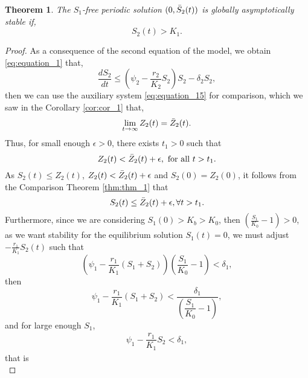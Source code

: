 \documentclass[10pt,letterpaper]{article}
\newtheorem{theorem}{Theorem}
\begin{document}
\begin{theorem}\label{thm:thm_6}
The $S_1$-free periodic solution $(0,\Bar{S}_2(t))$ is globally asymptotically stable if,
\begin{equation}\label{eq:equation_24}
    S_2(t)>K_1.
\end{equation}
\end{theorem}
\begin{proof}
As a consequence of the second equation of the model, we obtain \eqref{eq:equation_1} that,
\begin{equation}\label{eq:equation_25}
 \dfrac{dS_2}{dt}\leq\left(\psi_2-\dfrac{r_2}{K_2}S_2\right)S_2- \delta_2 S_2,   
\end{equation}
then we can use the auxiliary system \eqref{eq:equation_15} for comparison, which we saw in the Corollary \eqref{cor:cor_1} that,
\begin{equation}\label{eq:equation_26}
    \lim_{t \to \infty} Z_2(t) = \Bar{Z}_2(t).
\end{equation}
Thus, for small enough $\epsilon>0$, there exists $t_1>0$ such that 
\begin{equation}\label{eq:equation_27}
    Z_2(t)<\Bar{Z}_2(t)+\epsilon, \mbox{ for all } t>t_1.
\end{equation}
As $S_2(t) \leq Z_2(t)$, $Z_2(t) < \Bar{Z}_2(t)+\epsilon$ and $S_2(0) = Z_2(0)$, it follows from the Comparison Theorem \eqref{thm:thm_1} that
\begin{equation}\label{eq:equation_28}
    S_2(t)\leq\Bar{Z}_2(t)+\epsilon,  \forall t>t_1.
\end{equation}
Furthermore, since we are considering $S_1(0)>K_b >K_0$, then $\left(\frac{S_1}{K_0} - 1\right)>0$, as we want stability for the equilibrium solution $S_1(t) = 0$, we must adjust $-\frac{r_1}{K_1}S_2(t)$ such that
\begin{equation}\label{eq:equation_29}
    \left(\psi_1 - \dfrac{r_1}{K_1}(S_1+S_2)\right)\left(\dfrac{S_1}{K_0} - 1\right) < \delta_1,
\end{equation}then
\begin{equation}\label{eq:equation_30}
    \psi_1 - \dfrac{r_1}{K_1}(S_1+S_2) < \dfrac{\delta_1}{\left(\dfrac{S_1}{K_0} - 1\right)},
\end{equation}
and for large enough $S_1$,
\begin{align}\label{eq:equation_31}
     \psi_1 - \dfrac{r_1}{K_1} S_2 < \delta_1,     
\end{align}that is
\begin{equation}\label{eq:equation_32}

\end{equation}
\end{proof}
\end{document}
